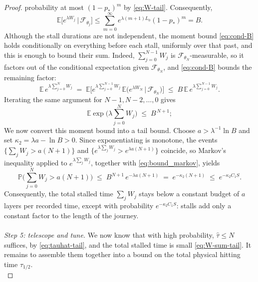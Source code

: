 \documentclass[
    aps,
    superscriptaddress,
    onecolumn,
    10pt,
    prx,
    nofootinbib
]{revtex4-2}
\theoremstyle{namedstatement}
\theoremstyle{plain}
\begin{document}
\begin{proof}
probability at most $(1-p_\ast)^m$ by \cref{eq:W-tail}. Consequently,
\begin{equation}\label{eq:cond-B}
  \mathbb E\big[e^{\lambda W_j}\,\big|\,\mathcal{F}_{\theta_j}\big]
  \le\sum_{m=0}^{\infty}e^{\lambda(m+1)L_0}(1-p_\ast)^m=B.
\end{equation}
Although the stall durations are not independent, the moment bound \cref{eq:cond-B}
holds conditionally on everything before each stall, uniformly over that past, and
this is enough to bound their sum. Indeed, $\sum_{j=0}^{N-1}W_j$ is
$\mathcal F_{\theta_N}$-measurable, so it factors out of the conditional expectation
given $\mathcal F_{\theta_N}$, and \cref{eq:cond-B} bounds the remaining factor:
\begin{equation}
  \mathbb E\,e^{\lambda\sum_{j=0}^{N}W_j}
  \;=\;\mathbb E\Big[e^{\lambda\sum_{j=0}^{N-1}W_j}\,
        \mathbb E\big(e^{\lambda W_N}\,\big|\,\mathcal F_{\theta_N}\big)\Big]
  \;\le\;B\,\mathbb E\,e^{\lambda\sum_{j=0}^{N-1}W_j}.
\end{equation}
Iterating the same argument for $N-1,N-2,\dots,0$ gives
\begin{equation}\label{eq:bound_markov}
  \mathbb E\exp\Big(\lambda\sum_{j=0}^{N}W_j\Big)\;\le\;B^{\,N+1};
\end{equation}
We now convert this moment bound into a tail bound. Choose $a>\lambda^{-1}\ln B$ and
set $\kappa_2=\lambda a-\ln B>0$. Since exponentiating is monotone, the events
$\{\sum_j W_j>a(N+1)\}$ and $\{e^{\lambda\sum_j W_j}>e^{\lambda a(N+1)}\}$ coincide,
so Markov's inequality applied to $e^{\lambda\sum_j W_j}$, together with
\cref{eq:bound_markov}, yields
\begin{equation}\label{eq:W-sum-tail}
  \mathbb P\Big(\sum_{j=0}^{N}W_j>a(N+1)\Big)
  \;\le\;B^{N+1}\,e^{-\lambda a(N+1)}
  \;=\;e^{-\kappa_2(N+1)}\;\le\;e^{-\kappa_2C_1S}.
\end{equation}
Consequently, the total stalled time $\sum_j W_j$ stays below a constant budget of
$a$ layers per recorded time, except with probability $e^{-\kappa_2 C_1 S}$: stalls
add only a constant factor to the length of the journey.
\\
\\
\medskip\noindent\emph{Step 5: telescope and tune.}
We now know that with high probability, $\widehat\tau\leq N$ suffices, by \cref{eq:tauhat-tail}, and the total stalled time is small \cref{eq:W-sum-tail}. It remains to assemble them together into a bound on the total physical hitting time $\tau_{1/2}$.
\\

\end{proof}
\end{document}
